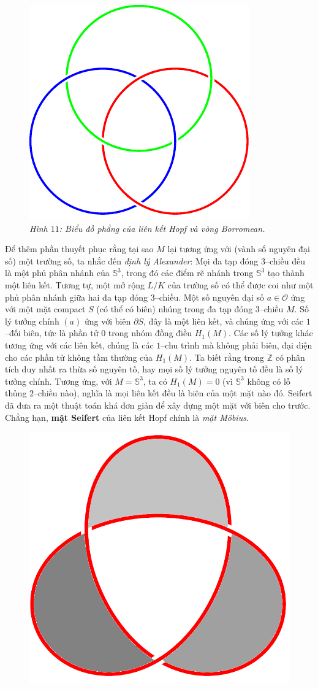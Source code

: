 \begin{multicols}{2}
\begin{figure}[H]
		\includegraphics[width= 0.4\linewidth]{borromean.pdf}
		\caption{\small\textit{\color{duongvaotoanhoc}Hình $11$: Biểu đồ phẳng của liên kết Hopf và vòng Borromean.}}
		\vspace*{-10pt}
	\end{figure}
	Để thêm phần thuyết phục rằng tại sao $M$ lại tương ứng với (vành số nguyên đại số) một trường số, ta nhắc đến {\it định lý Alexander}: Mọi đa tạp đóng $3$--chiều đều là một phủ phân nhánh của $\mathbb{S}^3$, trong đó các điểm rẽ nhánh trong $\mathbb{S}^3$ tạo thành một liên kết. Tương tự, một mở rộng $L/K$ của trường số có thể được coi như một phủ phân nhánh giữa hai đa tạp đóng $3$--chiều.
	\vskip 0.1cm
	Một số nguyên đại số $a \in \mathcal{O}$ ứng với một mặt compact $S$ (có thể có biên) nhúng trong đa tạp đóng $3$--chiều $M$. Số lý tưởng chính $(a)$ ứng với biên $\partial S$, đây là một liên kết, và chúng ứng với các $1$--đối biên, tức là phần tử $0$ trong nhóm đồng điều $H_1(M)$. Các số lý tưởng khác tương ứng với các liên kết, chúng là các $1$--chu trình mà không phải biên, đại diện cho các phần tử không tầm thường của $H_1(M)$. Ta biết rằng trong $\mathbb{Z}$ có phân tích duy nhất ra thừa số nguyên tố, hay mọi số lý tưởng nguyên tố đều là số lý tưởng chính. Tương ứng, với $M = \mathbb{S}^3$, ta có $H_1(M) = 0$ (vì $\mathbb{S}^3$ không có lỗ thủng $2$--chiều nào), nghĩa là mọi liên kết đều là biên của một mặt nào đó. Seifert đã đưa ra một thuật toán khá đơn giản để xây dựng một mặt với biên cho trước. Chẳng hạn, {\bf\color{duongvaotoanhoc} mặt Seifert} của liên kết Hopf chính là {\it mặt M\"obius}.
	\begin{figure}[H]
		\vspace*{-5pt}
		\centering
		\captionsetup{labelformat= empty, justification=centering}
		\includegraphics[width= 0.4\linewidth]{seifert1}\quad\quad

\end{figure}
\end{multicols}
